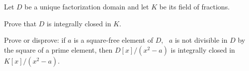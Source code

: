 Let $D$ be a unique factorization domain and let $K$ be its field of
fractions.
\begin{alist}
\item Prove that $D$ is integrally closed in $K$.
\item Prove or disprove: if $a$ is a square-free element of $D$, \ie\
$a$ is not divisible in $D$ by the square of a prime element, then
$D[x]/(x^2-a)$ is integrally closed in $K[x]/(x^2-a)$.
\end{alist}
